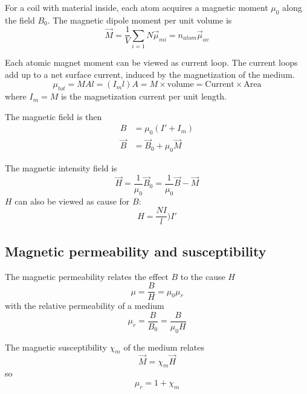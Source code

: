 For a coil with material inside, each atom acquires a magnetic moment $\mu_0$ along the field $B_0$.
The magnetic dipole moment per unit volume is
\begin{equation}
    \vec{M} = \frac{1}{V} \sum\limits_{i=1}{N}\vec{\mu}_{mi} = n_{atom} \vec{\mu}_{av}
\end{equation}

Each atomic magnet moment can be viewed as current loop.
The current loops add up to a net surface current, induced by
the magnetization of the medium.
\begin{equation}
    \mu_{tot} = MAl = (I_m l) A = M \times \text{volume} = \text{Current} \times \text{Area}
\end{equation}
where $I_m = M$ is the magnetization current per unit length.

The magnetic field is then
\begin{align}
    B &= \mu_0 (I' + I_m) \\
    \vec{B} &= \vec{B}_0 + \mu_0 \vec{M}
\end{align}

The magnetic intensity field is
\begin{equation}
    \vec{H} = \frac{1}{\mu_0}\vec{B}_0 = \frac{1}{\mu_0}\vec{B} - \vec{M}
\end{equation}
$H$ can also be viewed as cause for $B$:
\begin{equation}
    H = \frac{N I}{l} ) I'
\end{equation}

\subsection{Magnetic permeability and susceptibility}
The magnetic permeability relates the effect $B$ to the cause $H$
\begin{equation}
    \mu = \frac{B}{H} = \mu_0 \mu_r
\end{equation}
with the relative permeability of a medium
\begin{equation}
    \mu_r = \frac{B}{B_0} = \frac{B}{\mu_0 H}
\end{equation}

The magnetic susceptibility $\chi_m$ of the medium relates
\begin{equation}
    \vec{M} = \chi_m \vec{H}
\end{equation}
so
\begin{equation}
    \mu_r = 1 + \chi_m
\end{equation}


